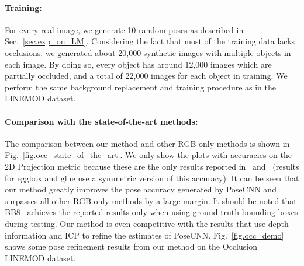 \documentclass[twocolumn]{svjour3}
\begin{document}
\paragraph{Training:} For every real image, we generate 10 random poses as described in Sec.~\ref{sec.exp_on_LM}. Considering the fact that most of the training data lacks occlusions, we generated about 20,000 synthetic images with multiple objects in each image. By doing so, every object has around 12,000 images which are partially occluded, and a total of 22,000 images for each object in training. We perform the same background replacement and training procedure as in the LINEMOD dataset. 


\paragraph{Comparison with the state-of-the-art methods:} The comparison between our method and other RGB-only methods is shown in Fig.~\ref{fig.occ_state_of_the_art}. We only show the plots with accuracies on the 2D Projection metric because these are the only results reported in~\cite{rad2017bb8} and~\citep{tekin2017real} (results for eggbox and glue use a symmetric version of this accuracy). It can be seen that our method greatly improves the pose accuracy generated by PoseCNN and surpasses all other RGB-only methods by a large margin. It should be noted that BB8~\citep{rad2017bb8}  achieves the reported results only when using ground truth bounding boxes during testing. Our method is even competitive with the results that use depth information and ICP to refine the estimates of PoseCNN. Fig.~\ref{fig.occ_demo} shows some pose refinement results from our method on the Occlusion LINEMOD dataset.
\end{document}
